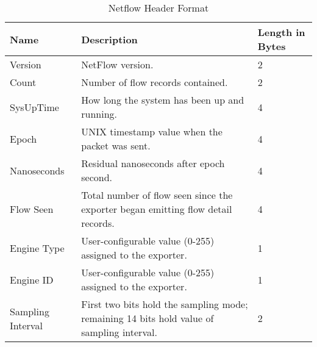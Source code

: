     \begin{table}[h]
     \begin{tabular}{|p{2cm}|p{11cm}|p{2cm}|}
      \hline
      {\bf Name} & {\bf Description} & {\bf Length in Bytes} \\ \hline
      Version & NetFlow version. & 2 \\ \hline
      Count   & Number of flow records contained. & 2 \\ \hline
      SysUpTime & How long the system has been up and running. & 4 \\ \hline
      Epoch	& UNIX timestamp value when the packet was sent. & 4 \\ \hline
      Nanoseconds & Residual nanoseconds after epoch second.	& 4\\ \hline
      Flow Seen	& Total number of flow seen since the exporter began emitting flow detail records. & 4\\ \hline
      Engine Type & User-configurable value (0-255) assigned to the exporter. & 1 \\ \hline
      Engine ID  & User-configurable value (0-255) assigned to the exporter. & 1 \\ \hline
      Sampling Interval & First two bits hold the sampling mode; remaining 14 bits hold value of sampling interval. & 2 \\ \hline
     \end{tabular}
     \caption{Netflow Header Format}
      \label{headerFormat}
    \end{table}
    
